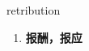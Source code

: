 
\begin{frame}
{\huge retribution}
\begin{center}
\begin{enumerate}\Large
  \item \textbf{报酬，报应}
\end{enumerate}
\end{center}
\end{frame}
